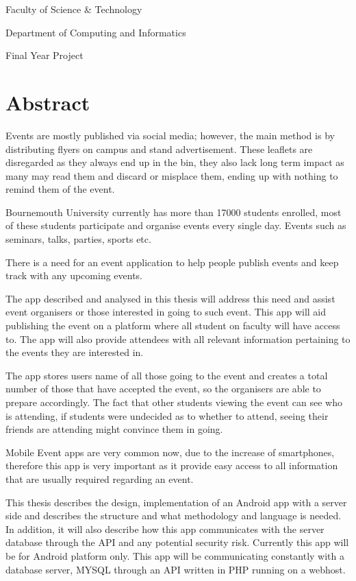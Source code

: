 \documentclass[11pt, twoside]{report}
\begin{document}
\hypersetup{
	colorlinks,
	citecolor=black,
	filecolor=black,
	linkcolor=black,
	urlcolor=black
}


\vspace*{\fill}
\begingroup
\centering
Faculty of Science \& Technology

Department of Computing and Informatics

Final Year Project

\endgroup
\vspace*{\fill}
\chapter*{Abstract}

Events are mostly published via social media; however, the main method is by distributing flyers on campus and stand advertisement. These leaflets are disregarded as they always end up in the bin, they also lack long term impact as many may read them and discard or misplace them, ending up with nothing to remind them of the event. 

Bournemouth University currently has more than 17000 students enrolled, most of these students participate and organise events every single day. Events such as seminars, talks, parties, sports etc.

There is a need for an event application to help people publish events and keep track with any upcoming events.

The app described and analysed in this thesis will address this need and assist event organisers or those interested in going to such event. This app will aid publishing the event on a platform where all student on faculty will have access to. The app will also provide attendees with all relevant information pertaining to the events they are interested in. 

The app stores users name of all those going to the event and creates a total number of those that have accepted the event, so the organisers are able to prepare accordingly. The fact that other students viewing the event can see who is attending, if students were undecided as to whether to attend, seeing their friends are attending might convince them in going.

Mobile Event apps are very common now, due to the increase of smartphones, therefore this app is very important as it provide easy access to all information that are usually required regarding an event.

This thesis describes the design, implementation of an Android app with a server side and describes the structure and what methodology and language is needed. In addition, it will also describe how this app communicates with the server database through the API and any potential security risk.
Currently this app will be for Android platform only. This app will be communicating constantly with a database server, MYSQL through an API written in PHP running on a webhost.
\end{document}
